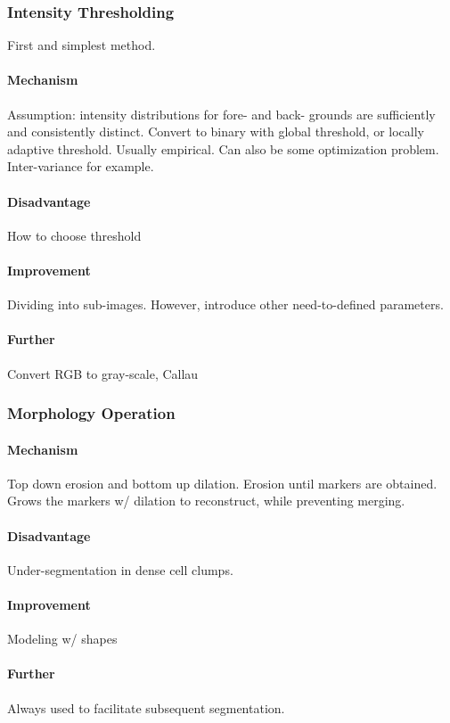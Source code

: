 \documentclass[10pt,a4paper]{article}
\begin{document}
\subsubsection{Intensity Thresholding}
First and simplest method.
\paragraph{Mechanism}
Assumption: intensity distributions for fore- and back- grounds are sufficiently and consistently distinct. Convert to binary with global threshold, or locally adaptive threshold. Usually empirical. Can also be some optimization problem. Inter-variance for example. 
\paragraph{Disadvantage}
How to choose threshold
\paragraph{Improvement}
Dividing into sub-images. However, introduce other need-to-defined parameters.
\paragraph{Further}
Convert RGB to gray-scale, Callau

\subsubsection{Morphology Operation}
\paragraph{Mechanism}
Top down erosion and bottom up dilation. Erosion until markers are obtained. Grows the markers w/ dilation to reconstruct, while preventing merging.
\paragraph{Disadvantage}
Under-segmentation in dense cell clumps.
\paragraph{Improvement}
Modeling w/ shapes
\paragraph{Further}
Always used to facilitate subsequent segmentation.
\end{document}

